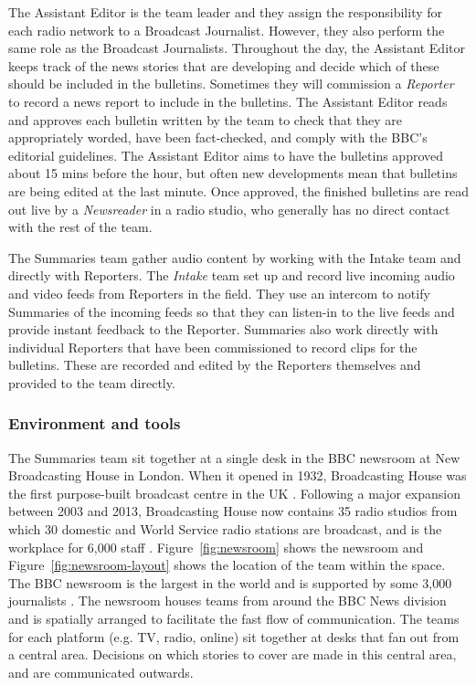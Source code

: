 The Assistant Editor is the team leader and they assign the responsibility for each radio network to a Broadcast
Journalist.  However, they also perform the same role as the Broadcast Journalists.  Throughout the day, the Assistant
Editor keeps track of the news stories that are developing and decide which of these should be included in the
bulletins. Sometimes they will commission a \textit{Reporter} to record a news report to include in the bulletins. The
Assistant Editor reads and approves each bulletin written by the team to check that they are appropriately worded, have
been fact-checked, and comply with the BBC's editorial guidelines.  The Assistant Editor aims to have the bulletins
approved about 15 mins before the hour, but often new developments mean that bulletins are being edited at the last
minute.  Once approved, the finished bulletins are read out live by a \textit{Newsreader} in a radio studio, who
generally has no direct contact with the rest of the team.

The Summaries team gather audio content by working with the Intake team and directly with Reporters. The
\textit{Intake} team set up and record live incoming audio and video feeds from Reporters in the field. They use an
intercom to notify Summaries of the incoming feeds so that they can listen-in to the live feeds and provide instant
feedback to the Reporter.  Summaries also work directly with individual Reporters that have been commissioned to record
clips for the bulletins. These are recorded and edited by the Reporters themselves and provided to the team directly.

\subsubsection{Environment and tools}
The Summaries team sit together at a single desk in the BBC newsroom at New Broadcasting House in London.  When it
opened in 1932, Broadcasting House was the first purpose-built broadcast centre in the UK \citep{Hines2008}.  Following
a major expansion between 2003 and 2013, Broadcasting House now contains 35 radio studios from which 30 domestic and
World Service radio stations are broadcast, and is the workplace for 6,000 staff \citep{BBCNews2013}.
Figure~\ref{fig:newsroom} shows the newsroom and Figure~\ref{fig:newsroom-layout} shows the location of the team within
the space. The BBC newsroom is the largest in the world and is supported by some 3,000 journalists
\citep[p.~80]{McLeish2015}.  The newsroom houses teams from around the BBC News division and is spatially arranged to
facilitate the fast flow of communication. The teams for each platform (e.g. TV, radio, online) sit together at desks
that fan out from a central area. Decisions on which stories to cover are made in this central area, and are
communicated outwards.

